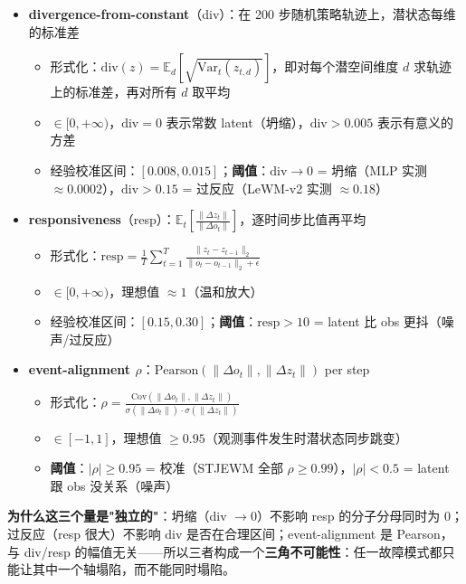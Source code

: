 \documentclass[11pt,a4paper]{article}
\begin{document}
\begin{itemize}[leftmargin=2em]
    \item \textbf{divergence-from-constant}（div）：在 200 步随机策略轨迹上，潜状态每维的标准差
    \begin{itemize}
        \item 形式化：$\text{div}(z) = \mathbb{E}_{d}\!\left[\sqrt{\text{Var}_{t}(z_{t,d})}\right]$，即对每个潜空间维度 $d$ 求轨迹上的标准差，再对所有 $d$ 取平均
        \item $\in [0, +\infty)$，$\text{div} = 0$ 表示常数 latent（坍缩），$\text{div} > 0.005$ 表示有意义的方差
        \item 经验校准区间：$[0.008, 0.015]$；\textbf{阈值}：$\text{div} \to 0$ = 坍缩（MLP 实测 $\approx 0.0002$），$\text{div} > 0.15$ = 过反应（LeWM-v2 实测 $\approx 0.18$）
    \end{itemize}
    \item \textbf{responsiveness}（resp）：$\mathbb{E}_t\!\left[\frac{\|\Delta z_t\|}{\|\Delta o_t\|}\right]$，逐时间步比值再平均
    \begin{itemize}
        \item 形式化：$\text{resp} = \frac{1}{T}\sum_{t=1}^T \frac{\|z_t - z_{t-1}\|_2}{\|o_t - o_{t-1}\|_2 + \epsilon}$
        \item $\in [0, +\infty)$，理想值 $\approx 1$（温和放大）
        \item 经验校准区间：$[0.15, 0.30]$；\textbf{阈值}：$\text{resp} > 10$ = latent 比 obs 更抖（噪声/过反应）
    \end{itemize}
    \item \textbf{event-alignment \ensuremath{\rho}}：$\text{Pearson}(\|\Delta o_t\|, \|\Delta z_t\|)$ per step
    \begin{itemize}
        \item 形式化：$\rho = \frac{\text{Cov}(\|\Delta o_t\|, \|\Delta z_t\|)}{\sigma(\|\Delta o_t\|) \cdot \sigma(\|\Delta z_t\|)}$
        \item $\in [-1, 1]$，理想值 $\geq 0.95$（观测事件发生时潜状态同步跳变）
        \item \textbf{阈值}：$|\rho| \geq 0.95$ = 校准（STJEWM 全部 $\rho \geq 0.99$），$|\rho| < 0.5$ = latent 跟 obs 没关系（噪声）
    \end{itemize}
\end{itemize}

\textbf{为什么这三个量是"独立的"}：坍缩（div $\to 0$）不影响 resp 的分子分母同时为 0；过反应（resp 很大）不影响 div 是否在合理区间；event-alignment 是 Pearson，与 div/resp 的幅值无关——所以三者构成一个\textbf{三角不可能性}：任一故障模式都只能让其中一个轴塌陷，而不能同时塌陷。
\end{document}
